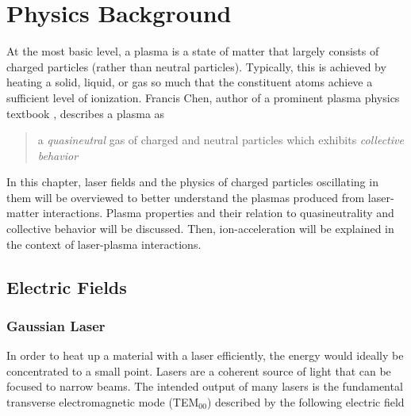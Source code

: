 \chapter{Physics Background} \label{ch:2}

At the most basic level, a plasma is a state of matter that largely consists of charged particles (rather than neutral particles). Typically, this is achieved by heating a solid, liquid, or gas so much that the constituent atoms achieve a sufficient level of ionization. Francis Chen, author of a prominent plasma physics textbook \cite{Chen_2015_Plasma}, describes a plasma as

\begin{quote}
	a \emph{quasineutral} gas of charged and neutral particles which exhibits \emph{collective behavior}
\end{quote}
In this chapter, laser fields and the physics of charged particles oscillating in them will be overviewed to better understand the plasmas produced from laser-matter interactions. Plasma properties and their relation to quasineutrality and collective behavior will be discussed. Then, ion-acceleration will be explained in the context of laser-plasma interactions.

\section{Electric Fields}


\subsection{Gaussian Laser}
In order to heat up a material with a laser efficiently, the energy would ideally be concentrated to a small point. Lasers are a coherent source of light that can be focused to narrow beams. The intended output of many lasers is the fundamental transverse electromagnetic mode \cite{Zangwill_2012} (TEM$_{00}$) described by the following electric field

